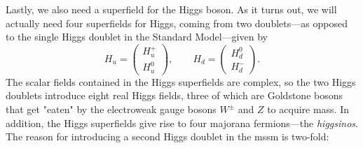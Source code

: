Lastly, we also need a superfield for the Higgs boson. As it turns out, we will actually need four superfields for Higgs, coming from two doublets---as opposed to the single Higgs doublet in the Standard Model---given by
\begin{equation}\label{eq:higgs_superfields}
    H_u = \begin{pmatrix}
        H_u^+ \\ H_u^0
    \end{pmatrix}, \qquad H_d = \begin{pmatrix}
        H_d^0 \\ H_d^-
    \end{pmatrix}.
\end{equation}
The scalar fields contained in the Higgs superfields are complex, so the two Higgs doublets introduce eight real Higgs fields, three of which are Goldstone bosons that get "eaten" by the electroweak gauge bosons $W^\pm$ and $Z$ to acquire mass.
In addition, the Higgs superfields give rise to four majorana fermions---the \emph{higgsinos}.
The reason for introducing a second Higgs doublet in the \gls{mssm} is two-fold:
